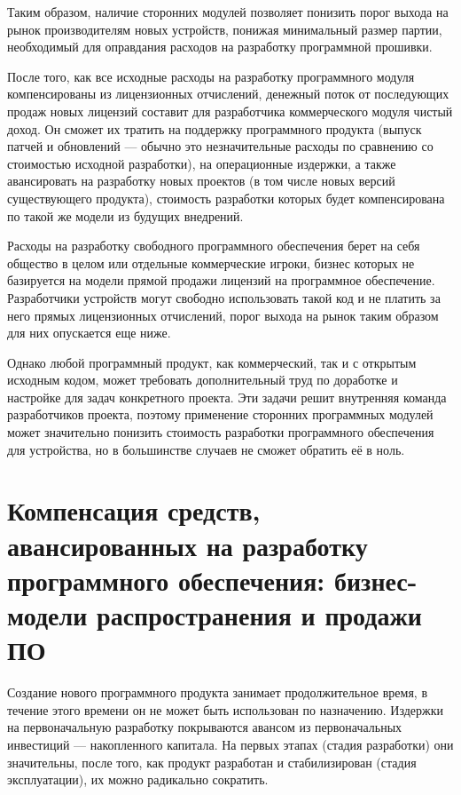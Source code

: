 \documentclass{article}
\begin{document}
Таким образом, наличие сторонних модулей позволяет понизить порог выхода на рынок производителям новых устройств, понижая минимальный размер партии, необходимый для оправдания расходов на разработку программной прошивки.

После того, как все исходные расходы на разработку программного модуля компенсированы из лицензионных отчислений, денежный поток от последующих продаж новых лицензий составит для разработчика коммерческого модуля чистый доход. Он сможет их тратить на поддержку программного продукта (выпуск патчей и обновлений — обычно это незначительные расходы по сравнению со стоимостью исходной разработки), на операционные издержки, а также авансировать на разработку новых проектов (в том числе новых версий существующего продукта), стоимость разработки которых будет компенсирована по такой же модели из будущих внедрений.

Расходы на разработку свободного программного обеспечения берет на себя общество в целом или отдельные коммерческие игроки, бизнес которых не базируется на модели прямой продажи лицензий на программное обеспечение. Разработчики устройств могут свободно использовать такой код и не платить за него прямых лицензионных отчислений, порог выхода на рынок таким образом для них опускается еще ниже.

Однако любой программный продукт, как коммерческий, так и с открытым исходным кодом, может требовать дополнительный труд по доработке и настройке для задач конкретного проекта. Эти задачи решит внутренняя команда разработчиков проекта, поэтому применение сторонних программных модулей может значительно понизить стоимость разработки программного обеспечения для устройства, но в большинстве случаев не сможет обратить её в ноль.

\section*{Компенсация средств, авансированных на разработку программного обеспечения: бизнес-модели распространения и продажи ПО}

Создание нового программного продукта занимает продолжительное время, в течение этого времени он не может быть использован по назначению. Издержки на первоначальную разработку покрываются авансом из первоначальных инвестиций — накопленного капитала. На первых этапах (стадия разработки) они значительны, после того, как продукт разработан и стабилизирован (стадия эксплуатации), их можно радикально сократить.
\end{document}
